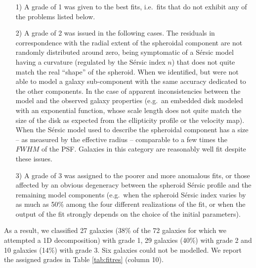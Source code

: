 \documentclass[preprint2]{emulateapj}
\begin{document}
\begin{itemize}
\item [1)] A grade of 1 was given to the best fits, i.e.~fits that do not exhibit any of the problems listed below.
\item [2)] A grade of 2 was issued in the following cases. 
The residuals in correspondence with the radial extent of the spheroidal component are not randomly distributed around zero, 
being symptomatic of a S\'ersic model having a curvature (regulated by the S\'ersic index $n$) 
that does not quite match the real ``shape'' of the spheroid. 
When we identified, 
but were not able to model a galaxy sub-component with the same accuracy dedicated to the other components.
In the case of apparent inconsistencies between the model and the observed galaxy properties 
(e.g.~an embedded disk modeled with an exponential function, 
whose scale length does not quite match the size of the disk as expected from the ellipticity profile or the velocity map).
When the S\'ersic model used to describe the spheroidal component has a size -- as measured by the effective radius -- 
comparable to a few times the $FWHM$ of the PSF.
Galaxies in this category are reasonably well fit despite these issues.
\item [3)] A grade of 3 was assigned to the poorer and more anomalous fits, 
or those affected by an obvious degeneracy between the spheroid S\'ersic profile and the remaining model components 
(e.g.~when the spheroid S\'ersic index varies by as much as 50\% among the four different realizations of the fit, 
or when the output of the fit strongly depends on the choice of the initial parameters).
\end{itemize}
As a result, we classified 27 galaxies (38\% of the 72 galaxies for which we attempted a 1D decomposition) with grade 1, 
29 galaxies (40\%) with grade 2 and 10 galaxies (14\%) with grade 3.
Six galaxies could not be modelled.
We report the assigned grades in Table \ref{tab:fitres} (column 10).
\end{document}
